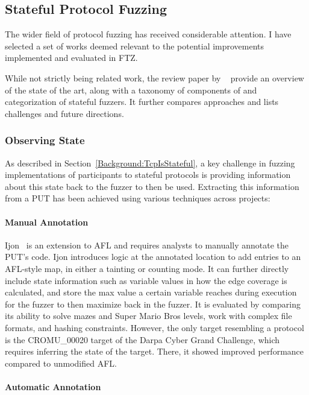 \documentclass{article}
\newcommand{\proj}{FTZ\xspace}
\let\savedCite=\cite
\renewcommand{\cite}{\unskip~\savedCite}
\begin{document}
\begin{multicols}{2}
  \subsection{Stateful Protocol Fuzzing}

  The wider field of protocol fuzzing has received considerable attention. I have selected a set of works deemed relevant to the potential improvements implemented and evaluated in \proj.

  While not strictly being related work, the review paper by \citeauthor{StatefulReview}\cite{StatefulReview} provide an overview of the state of the art, along with a taxonomy of components of and categorization of stateful fuzzers. It further compares approaches and lists challenges and future directions.

  \subsubsection{Observing State}

  As described in Section~\ref{Background:TcpIsStateful}, a key challenge in fuzzing implementations of participants to stateful protocols is providing information about this state back to the fuzzer to then be used. Extracting this information from a PUT has been achieved using various techniques across projects:

  \paragraph{Manual Annotation}

  Ijon\cite{Ijon} is an extension to AFL and requires analysts to manually annotate the PUT's code. Ijon introduces logic at the annotated location to add entries to an AFL-style map, in either a tainting or counting mode. It can further directly include state information such as variable values in how the edge coverage is calculated, and store the max value a certain variable reaches during execution for the fuzzer to then maximize back in the fuzzer. It is evaluated by comparing its ability to solve mazes and Super Mario Bros levels, work with complex file formats, and hashing constraints. However, the only target resembling a protocol is the CROMU\_00020 target of the Darpa Cyber Grand Challenge, which requires inferring the state of the target. There, it showed improved performance compared to unmodified AFL.

  \paragraph{Automatic Annotation}


\end{multicols}
\end{document}
